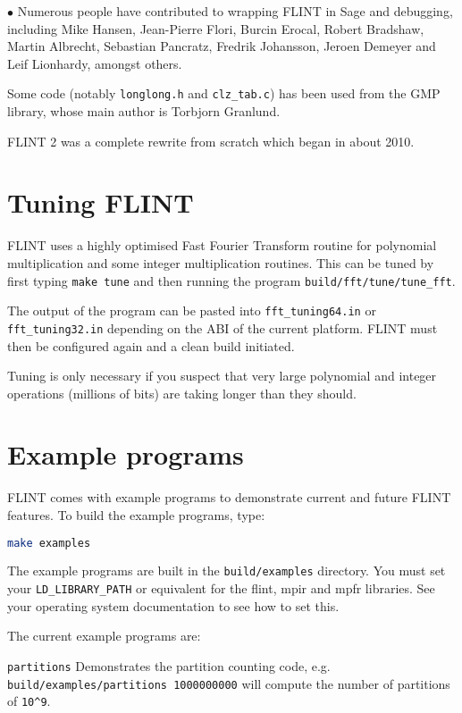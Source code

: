 \documentclass[a4paper,10pt]{book}
\newcommand{\code}{\lstinline}
\begin{document}
$\bullet$ Numerous people have contributed to wrapping FLINT in Sage and
debugging, including Mike Hansen, Jean-Pierre Flori, Burcin Erocal, Robert
Bradshaw, Martin Albrecht, Sebastian Pancratz, Fredrik Johansson, Jeroen
Demeyer and Leif Lionhardy, amongst others.

Some code (notably \code{longlong.h} and \code{clz_tab.c}) has been used from
the GMP library, whose main author is Torbjorn Granlund.

FLINT 2 was a complete rewrite from scratch which began in about 2010.

\chapter{Tuning FLINT}

FLINT uses a highly optimised Fast Fourier Transform routine for
polynomial multiplication and some integer multiplication routines. This
can be tuned by first typing \code{make tune} and then running the
program \code{build/fft/tune/tune_fft}.

The output of the program can be pasted into  \code{fft_tuning64.in} or
\code{fft_tuning32.in} depending on the ABI of the current platform. FLINT
must then be configured again and a clean build initiated.

Tuning is only necessary if you suspect that very large polynomial and
integer operations (millions of bits) are taking longer than they should.

\chapter{Example programs}

FLINT comes with example programs to demonstrate current and future FLINT
features.  To build the example programs, type:

\begin{lstlisting}[language=bash]
make examples
\end{lstlisting}

The example programs are built in the \code{build/examples} directory.
You must set your \code{LD_LIBRARY_PATH} or equivalent for the flint, mpir
and mpfr libraries. See your operating system documentation to see how to
set this.

The current example programs are:

\code{partitions} Demonstrates the partition counting code, e.g.\\
\code{build/examples/partitions 1000000000} will compute the number of
partitions of \code{10^9}.
\end{document}
